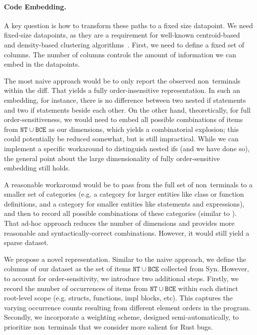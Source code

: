 \paragraph{Code Embedding.} A key question is how to transform these paths to a fixed size datapoint. We need fixed-size datapoints, as they are a requirement for well-known centroid-based and density-based clustering algorithms~\citep{xu2005survey}. First, we need to define a fixed set of columns. The number of columns controls the amount of information we can embed in the datapoints. 

The most naive approach would be to only report the observed non~terminals within the diff. That yields a fully order-insensitive representation. In such an embedding, for instance, there is no difference between two nested if statements and two if statements beside each other. On the other hand, theoretically, for full order-sensitiveness, we would need to embed all possible combinations of items from $\mathtt{NT} \cup \mathtt{BCE}$ as our dimensions, which yields a combinatorial explosion; this could potentially be reduced somewhat, but is still impractical. While we can implement a specific workaround to distinguish nested ifs (and we have done so), the general point about the large dimensionality of fully order-sensitive embedding still holds.

A reasonable workaround would be to pass from the full set of non~terminals to a smaller set of categories (e.g. a category for larger entities like class or function definitions, and a category for smaller entities like statements and expressions), and then to record all possible combinations of these categories (similar to \cite{hanam2016discovering}). That ad-hoc approach reduces the number of dimensions and provides more reasonable and syntactically-correct combinations. However, it would still yield a sparse dataset. 

We propose a novel representation. Similar to the naive approach, we define the columns of our dataset as the set of items $\mathtt{NT} \cup \mathtt{BCE}$ collected from Syn. However, to account for order-sensitivity, we introduce two additional steps. Firstly, we record the number of occurrences of items from $\mathtt{NT} \cup \mathtt{BCE}$ within each distinct root-level scope (e.g. structs, functions, impl blocks, etc). This captures the varying occurrence counts resulting from different element orders in the program. Secondly, we incorporate a weighting scheme, designed semi-automatically, to prioritize non~terminals that we consider more salient for Rust bugs.

